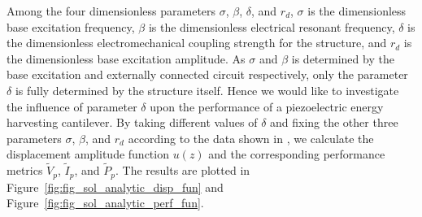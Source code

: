 \documentclass{article}
\begin{document}



Among the four dimensionless parameters $\sigma$, $\beta$, $\delta$, and $r_d$, $\sigma$ is the dimensionless base excitation frequency, $\beta$ is the dimensionless electrical resonant frequency, $\delta$ is the dimensionless electromechanical coupling strength for the structure, and $r_d$ is the dimensionless base excitation amplitude. As $\sigma$ and $\beta$ is determined by the base excitation and externally connected circuit respectively, only the parameter $\delta$ is fully determined by the structure itself. Hence we would like to investigate the influence of parameter $\delta$ upon the performance of a piezoelectric energy harvesting cantilever. By taking different values of $\delta$ and fixing the other three parameters $\sigma$, $\beta$, and $r_d$ according to the data shown in \cite{erturk2008distributed,erturk2009experimentally}, we calculate the displacement amplitude function $u(z)$ and the corresponding performance metrics $\tilde{V}_p$, $\tilde{I}_p$, and $\tilde{P}_p$. The results are plotted in Figure~\ref{fig:fig_sol_analytic_disp_fun} and Figure~\ref{fig:fig_sol_analytic_perf_fun}.
\end{document}
